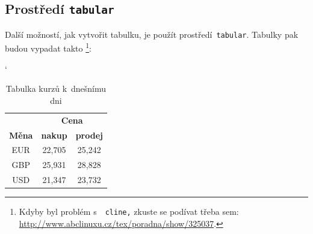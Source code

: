 \documentclass[11pt, a4paper]{article}
\begin{document}
\subsection{Prostředí \texttt{tabular}}
Další možností, jak vytvořit tabulku, je použít prostředí\, \verb|tabular|. Tabulky pak budou vypadat
takto \footnote{Kdyby byl problém s~\, \texttt{cline,} 
zkuste se podívat třeba sem: \url{http://www.abclinuxu.cz/tex/poradna/show/325037}.}:

\bigskip
\begin{table}[h] \catcode`
    \centering
        \begin{tabular}{|c|c|c|}
            \hline
                &\multicolumn{2}{|c|}{\textbf{Cena}} \\
            \cline{2-3}   
                \textbf{Měna} & \textbf{nakup} & \textbf{prodej} \\
                \hline
                EUR & 22,705 & 25,242 \\
                GBP & 25,931 & 28,828 \\
                USD & 21,347 & 23,732 \\
            \hline
        \end{tabular} \caption{Tabulka kurzů k~dnešnímu dni} \label{tab1}
\end{table}
\bigskip
\end{document}
